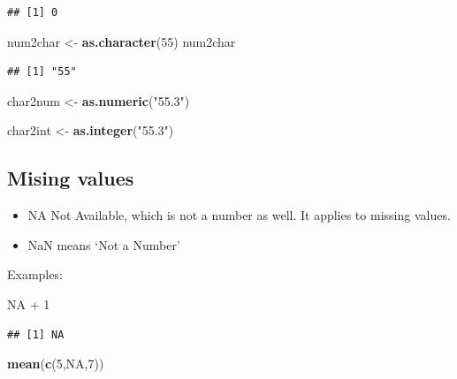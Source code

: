\documentclass[]{book}
\newenvironment{Shaded}{\begin{snugshade}}{\end{snugshade}}
\newcommand{\KeywordTok}[1]{\textcolor[rgb]{0.13,0.29,0.53}{\textbf{{#1}}}}
\newcommand{\DecValTok}[1]{\textcolor[rgb]{0.00,0.00,0.81}{{#1}}}
\newcommand{\StringTok}[1]{\textcolor[rgb]{0.31,0.60,0.02}{{#1}}}
\newcommand{\OtherTok}[1]{\textcolor[rgb]{0.56,0.35,0.01}{{#1}}}
\newcommand{\NormalTok}[1]{{#1}}
\providecommand{\tightlist}{%
  \setlength{\itemsep}{0pt}\setlength{\parskip}{0pt}}
\begin{document}
\begin{verbatim}
## [1] 0
\end{verbatim}

\begin{Shaded}
\begin{Highlighting}[]
\NormalTok{num2char <-}\StringTok{ }\KeywordTok{as.character}\NormalTok{(}\DecValTok{55}\NormalTok{)}
\NormalTok{num2char}
\end{Highlighting}
\end{Shaded}

\begin{verbatim}
## [1] "55"
\end{verbatim}

\begin{Shaded}
\begin{Highlighting}[]
\NormalTok{char2num  <-}\StringTok{ }\KeywordTok{as.numeric}\NormalTok{(}\StringTok{"55.3"}\NormalTok{)}

\NormalTok{char2int  <-}\StringTok{ }\KeywordTok{as.integer}\NormalTok{(}\StringTok{"55.3"}\NormalTok{)}
\end{Highlighting}
\end{Shaded}

\subsection{Mising values}\label{mising-values}

\begin{itemize}
\tightlist
\item
  NA Not Available, which is not a number as well. It applies to missing
  values.
\item
  NaN means `Not a Number'
\end{itemize}

Examples:

\begin{Shaded}
\begin{Highlighting}[]
\OtherTok{NA} \NormalTok{+}\StringTok{ }\DecValTok{1}
\end{Highlighting}
\end{Shaded}

\begin{verbatim}
## [1] NA
\end{verbatim}

\begin{Shaded}
\begin{Highlighting}[]
\KeywordTok{mean}\NormalTok{(}\KeywordTok{c}\NormalTok{(}\DecValTok{5}\NormalTok{,}\OtherTok{NA}\NormalTok{,}\DecValTok{7}\NormalTok{))}
\end{Highlighting}
\end{Shaded}
\end{document}
